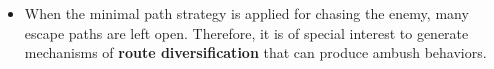 \begin{large}
\begin{itemize}
\bigskip
\item When the minimal path strategy is applied for chasing
the enemy, many escape paths are left open. Therefore,
it is of special interest to generate mechanisms of \textbf{route
diversification} that can produce ambush behaviors.
\end{itemize}
\end{large}

